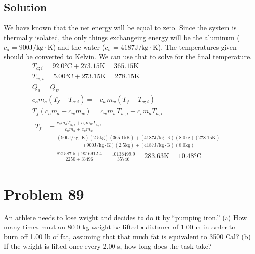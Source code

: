 \documentclass[12pt]{article}
\begin{document}
        \subsection{Solution}
            We have known that the net energy will be equal to zero.
            Since the system is thermally isolated, the only things exchangeing energy will be the aluminum ($c_a = 900 \unit{\joule/\kilo\gram\cdot\kelvin}$) and the water ($c_w = 4187 \unit{\joule/\kilo\gram\cdot\kelvin}$).
            The temperatures given should be converted to Kelvin.
            We can use that to solve for the final temperature.
            \begin{gather}
                T_{a;i} =   92.0 \unit{\celsius} + 273.15 \unit{\kelvin}    =   365.15 \unit{\kelvin}\\
                T_{w;i} =   5.00 \unit{\celsius} + 273.15 \unit{\kelvin}    =   278.15 \unit{\kelvin}\\
                Q_{a}   =   Q_{w}\\
                c_a m_a (T_f - T_{a;i}) =   - c_w m_w (T_f - T_{w;i})\\
                T_f (c_a m_a + c_w m_w) =   c_w m_w T_{w;i} + c_a m_a T_{a;i}\\
                \begin{align} 
                    T_f &=  \frac{c_a m_a T_{a;i} + c_w m_w T_{w;i}}{c_a m_a + c_w m_w}\\
                        &=  \frac{(900 \unit{\joule/\kilo\gram\cdot\kelvin}) (2.5 \unit{\kilo\gram}) (365.15 \unit{\kelvin}) + (4187 \unit{\joule/\kilo\gram\cdot\kelvin}) (8.0 \unit{\kilo\gram}) (278.15 \unit{\kelvin})}{(900 \unit{\joule/\kilo\gram\cdot\kelvin}) (2.5 \unit{\kilo\gram}) + (4187 \unit{\joule/\kilo\gram\cdot\kelvin}) (8.0 \unit{\kilo\gram})}\\
                        &=  \frac{821587.5 + 9316912.4}{2250 + 33496}
                        =   \frac{10138499.9}{35746}
                        =   283.63 \unit{\kelvin}
                        =   \boxed{10.48 \unit{\celsius}}
                \end{align}
            \end{gather}

    \pagebreak
    \section{Problem 89}
        An athlete needs to lose weight and decides to do it by “pumping iron.” 
        (a) How many times must an 80.0 kg weight be lifted a distance of 1.00 m in order to burn off 1.00 lb of fat, assuming that that much fat is equivalent to 3500 Cal? 
        (b) If the weight is lifted once every 2.00 s, how long does the task take?
\end{document}
